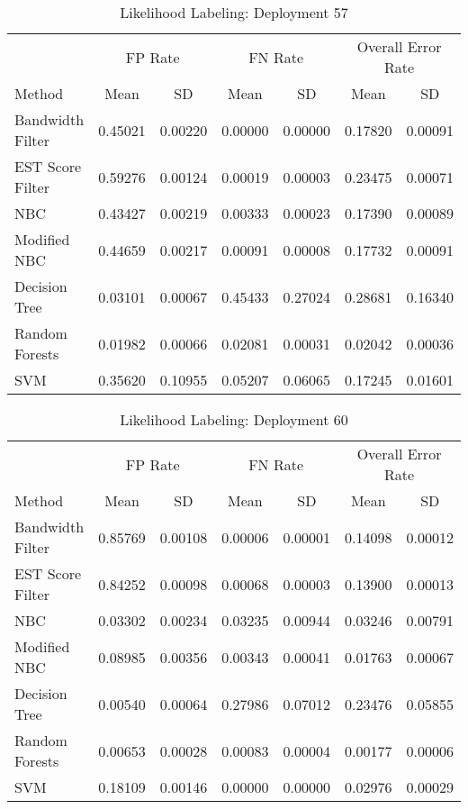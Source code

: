 \documentclass[twoside]{article}
\begin{document}
\begin{table}[H]
\caption{Likelihood Labeling: Deployment 57}
\centering
\begin{tabular}{lcccccc}
\toprule
\multicolumn{1}{c}{ } 
&\multicolumn{2}{c}{FP Rate } 
&\multicolumn{2}{c}{FN Rate } 
&\multicolumn{2}{c}{Overall Error Rate } \\
\cmidrule(r){2-3}
\cmidrule(r){4-5}
\cmidrule(r){6-7}
Method& Mean & SD & Mean & SD & Mean & SD \\
\midrule
Bandwidth Filter & 0.45021 & 0.00220 & 0.00000 & 0.00000 & 0.17820 & 0.00091 \\
EST Score Filter & 0.59276 & 0.00124 & 0.00019 & 0.00003 & 0.23475 & 0.00071 \\
NBC & 0.43427 & 0.00219 & 0.00333 & 0.00023 & 0.17390 & 0.00089 \\
Modified NBC & 0.44659 & 0.00217 & 0.00091 & 0.00008 & 0.17732 & 0.00091 \\
Decision Tree & 0.03101 & 0.00067 & 0.45433 & 0.27024 & 0.28681 & 0.16340 \\
Random Forests & 0.01982 & 0.00066 & 0.02081 & 0.00031 & 0.02042 & 0.00036 \\
SVM & 0.35620 & 0.10955 & 0.05207 & 0.06065 & 0.17245 & 0.01601 \\
\bottomrule
\end{tabular}
\end{table}

\begin{table}[H]
\caption{Likelihood Labeling: Deployment 60}
\centering
\begin{tabular}{lcccccc}
\toprule
\multicolumn{1}{c}{ } 
&\multicolumn{2}{c}{FP Rate } 
&\multicolumn{2}{c}{FN Rate } 
&\multicolumn{2}{c}{Overall Error Rate } \\
\cmidrule(r){2-3}
\cmidrule(r){4-5}
\cmidrule(r){6-7}
Method& Mean & SD & Mean & SD & Mean & SD \\
\midrule
Bandwidth Filter & 0.85769 & 0.00108 & 0.00006 & 0.00001 & 0.14098 & 0.00012 \\
EST Score Filter & 0.84252 & 0.00098 & 0.00068 & 0.00003 & 0.13900 & 0.00013 \\
NBC & 0.03302 & 0.00234 & 0.03235 & 0.00944 & 0.03246 & 0.00791 \\
Modified NBC & 0.08985 & 0.00356 & 0.00343 & 0.00041 & 0.01763 & 0.00067 \\
Decision Tree & 0.00540 & 0.00064 & 0.27986 & 0.07012 & 0.23476 & 0.05855 \\
Random Forests & 0.00653 & 0.00028 & 0.00083 & 0.00004 & 0.00177 & 0.00006 \\
SVM & 0.18109 & 0.00146 & 0.00000 & 0.00000 & 0.02976 & 0.00029 \\
\bottomrule
\end{tabular}
\end{table}
\end{document}
